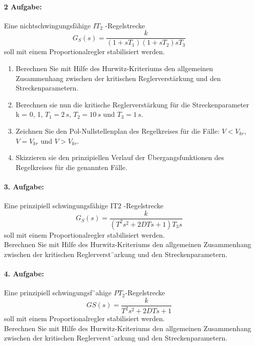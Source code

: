 \documentclass[a4paper, twoside, 11pt]{article}
\begin{document}
\paragraph{2 Aufgabe:}  Eine nichtschwingungsfähige $IT_2$ -Regelstrecke
\begin{equation*}
	G_S(s) = \frac{k}{(1+sT_1)(1+sT_2)sT_3}
\end{equation*}
soll mit einem Proportionalregler stabilisiert werden.
\begin{enumerate}
	\item Berechnen Sie mit Hilfe des Hurwitz-Kriteriums den allgemeinen Zusammenhang zwischen der kritischen Reglerverstärkung und den Streckenparametern.
	\item Berechnen sie nun die kritische Reglerverstärkung für die Streckenparameter k = 0, 1, $T_1 = 2\, s$, $T_2 = 10\, s$ und $T_3 = 1\, s$.
	\item Zeichnen Sie den Pol-Nullstellenplan des Regelkreises für die Fälle: $V < V_{kr}$, $V = V_{kr}$ und $V > V_{kr}$.
	\item Skizzieren sie den prinzipiellen Verlauf der Übergangsfunktionen des Regelkreises für die genannten Fälle.
\end{enumerate}

\paragraph{3. Aufgabe:} Eine prinzipiell schwingungsfähige IT2 -Regelstrecke \\
\begin{equation*}
	G_S(s) = \frac{k}{(T^2s^2 + 2DT s + 1) T_3s}
\end{equation*}
soll mit einem Proportionalregler stabilisiert werden. \\
Berechnen Sie mit Hilfe des Hurwitz-Kriteriums den allgemeinen Zusammenhang zwischen der kritischen Reglerverst¨arkung und den Streckenparametern.

\paragraph{4. Aufgabe:} Eine prinzipiell schwingungsf¨ahige $PT_2$-Regelstrecke
\begin{equation*}
	GS (s) = \frac{k}{T^2s^2 + 2DTs + 1}
\end{equation*}
soll mit einem Proportionalregler stabilisiert werden. \\
Berechnen Sie mit Hilfe des Hurwitz-Kriteriums den allgemeinen Zusammenhang zwischen der kritischen Reglerverst¨arkung und den Streckenparametern.
\end{document}
